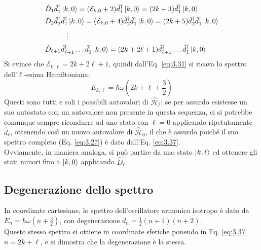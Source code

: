 \begin{equation*}
	\begin{split}
		&\hat{D}_1 \hat{d}_1^{\dagger} \ket{k,0} = (\mathcal{E}_{k,0} + 2) \hat{d}_1^{\dagger} \ket{k,0} = (2k + 3) \hat{d}_1^{\dagger} \ket{k,0}\\
		&\hat{D}_2 \hat{d}_2^{\dagger} \hat{d}_1^{\dagger} \ket{k,0} = (\mathcal{E}_{k,0} + 4) \hat{d}_2^{\dagger} \hat{d}_1^{\dagger} \ket{k,0} = (2k + 5) \hat{d}_2^{\dagger} \hat{d}_1^{\dagger} \ket{k,0}\\
		&\qquad\quad\vdots\\
		&\hat{D}_{\ell + 1} \hat{d}_{\ell + 1}^{\dagger} \dots \hat{d}_1^{\dagger} \ket{k,0} = (2k + 2\ell + 1) \hat{d}_{\ell + 1}^{\dagger} \dots \hat{d}_1^{\dagger} \ket{k,0}
	\end{split}
\end{equation*}
Si evince che $ \mathcal{E}_{k,\ell} = 2k + 2\ell + 1 $, quindi dall'Eq. \ref{eq:3.31} si ricava lo spettro dell'$ \ell $-esima Hamiltoniana:
\begin{equation}
	E_{k,\ell} = \hbar \omega \left( 2k + \ell + \frac{3}{2} \right)
	\label{eq:3.37}
\end{equation}
Questi sono tutti e soli i possibili autovalori di $ \hat{\mathcal{H}}_{\ell} $: se per assurdo esistesse un suo autostato con un autovalore non presente in questa sequenza, ci si potrebbe comunque sempre ricondurre ad uno stato con $ \ell = 0 $ applicando ripetutamente $ \hat{d}_{\ell} $, ottenendo così un nuovo autovalore di $ \hat{\mathcal{H}}_0 $, il che è assurdo poiché il suo spettro completo (Eq. \ref{eq:3.27}) è dato dall'Eq. \ref{eq:3.37}.\\
Ovviamente, in maniera analoga, si può partire da uno stato $ \ket{k,\ell} $ ed ottenere gli stati minori fino a $ \ket{k,0} $ applicando $ \hat{D}_{\ell} $.

\subsection{Degenerazione dello spettro}

In coordinate cartesiane, lo spettro dell'oscillatore armonico isotropo è dato da $ E_n = \hbar \omega \left( n + \frac{3}{2} \right) $, con degenerazione $ d_n = \frac{1}{2}(n + 1)(n + 2) $.\\
Questo stesso spettro si ottiene in coordinate sferiche ponendo in Eq. \ref{eq:3.37} $ n = 2k + \ell $, e si dimostra che la degenerazione è la stessa.

